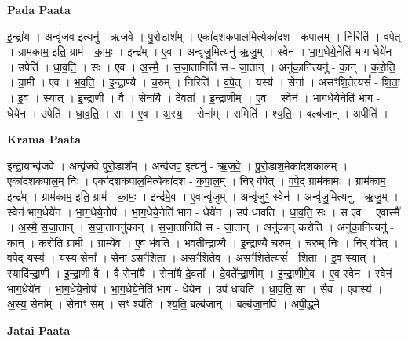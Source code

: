 \documentclass[17pt]{extarticle}
\begin{document}
\textbf{Pada Paata} \newline

इ॒न्द्रा॑य । अन्वृ॑जव॒ इत्यनु॑ - ऋ॒ज॒वे॒ । पु॒रो॒डाश᳚म् । एका॑दशकपाल॒मित्येका॑दश - क॒पा॒ल॒म् । निरिति॑ । व॒पे॒त् । ग्राम॑काम॒ इति॒ ग्राम॑ - का॒मः॒ । इन्द्र᳚म् । ए॒व । अन्वृ॑जु॒मित्यनु॑-ऋ॒जु॒म् । स्वेन॑ । भा॒ग॒धेये॒नेति॑ भाग-धेये॑न । उपेति॑ । धा॒व॒ति॒ । सः । ए॒व । अ॒स्मै॒ । स॒जा॒तानिति॑ स - जा॒तान् । अनु॑का॒नित्यनु॑ - का॒न् । क॒रो॒ति॒ । ग्रा॒मी । ए॒व । भ॒व॒ति॒ । इ॒न्द्रा॒ण्यै । च॒रुम् । निरिति॑ । व॒पे॒त् । यस्य॑ । सेना᳚ । असꣳ॑शि॒तेत्यसं᳚ - शि॒ता॒ । इ॒व॒ । स्यात् । इ॒न्द्रा॒णी । वै । सेना॑यै । दे॒वता᳚ । इ॒न्द्रा॒णीम् । ए॒व । स्वेन॑ । भा॒ग॒धेये॒नेति॑ भाग - धेये॑न । उपेति॑ । धा॒व॒ति॒ । सा । ए॒व । अ॒स्य॒ । सेना᳚म् । समिति॑ । श्य॒ति॒ । बल्ब॑जान् । अपीति॑ ।  \newline


\textbf{Krama Paata} \newline

इन्द्रा॒यान्वृ॑जवे । अन्वृ॑जवे पुरो॒डाश᳚म् । अन्वृ॑जव॒ इत्यनु॑ - ऋ॒ज॒वे॒ । पु॒रो॒डाश॒मेका॑दशकालम् । एका॑दशकपाल॒म् निः । एका॑दशकपाल॒मित्येका॑दश - क॒पा॒ल॒म् । निर् व॑पेत् । व॒पे॒द् ग्राम॑कामः । ग्राम॑काम॒ इन्द्र᳚म् । ग्राम॑काम॒ इति॒ ग्राम॑ - का॒मः॒ । इन्द्र॑मे॒व । ए॒वान्वृ॑जुम् । अन्वृ॑जुꣳ॒॒ स्वेन॑ । अन्वृ॑जु॒मित्यनु॑ - ऋ॒जु॒म् । स्वेन॑ भाग॒धेये॑न । भा॒ग॒धेये॒नोप॑ । भा॒ग॒धेये॒नेति॑ भाग - धेये॑न । उप॑ धावति । धा॒व॒ति॒ सः । स ए॒व । ए॒वास्मै᳚ । अ॒स्मै॒ स॒जा॒तान् । स॒जा॒ताननु॑कान् । स॒जा॒तानिति॑ स - जा॒तान् । अनु॑कान् करोति । अनु॑का॒नित्यनु॑ - का॒न्॒ । क॒रो॒ति॒ ग्रा॒मी । ग्रा॒म्ये॑व । ए॒व भ॑वति । भ॒व॒ती॒न्द्रा॒ण्यै । इ॒न्द्रा॒ण्यै च॒रुम् । च॒रुम् निः । निर् व॑पेत् । व॒पे॒द् यस्य॑ । यस्य॒ सेना᳚ । सेना ऽसꣳ॑शिता । असꣳ॑शितेव । असꣳ॑शि॒तेत्यसं᳚ - शि॒ता॒ । इ॒व॒ स्यात् । स्यादि॑न्द्रा॒णी । इ॒न्द्रा॒णी वै । वै सेना॑यै । सेना॑यै दे॒वता᳚ । दे॒वते᳚न्द्रा॒णीम् । इ॒न्द्रा॒णीमे॒व । ए॒व स्वेन॑ । स्वेन॑ भाग॒धेये॑न । भा॒ग॒धेये॒नोप॑ । भा॒ग॒धेये॒नेति॑ भाग - धेये॑न । उप॑ धावति । धा॒व॒ति॒ सा । सैव । ए॒वास्य॑ । अ॒स्य॒ सेना᳚म् । सेनाꣳ॒॒ सम् । सꣳ श्य॑ति । श्य॒ति॒ बल्ब॑जान् । बल्ब॑जा॒नपि॑ । अपी॒द्ध्मे \newline

\textbf{Jatai Paata} \newline
\end{document}
